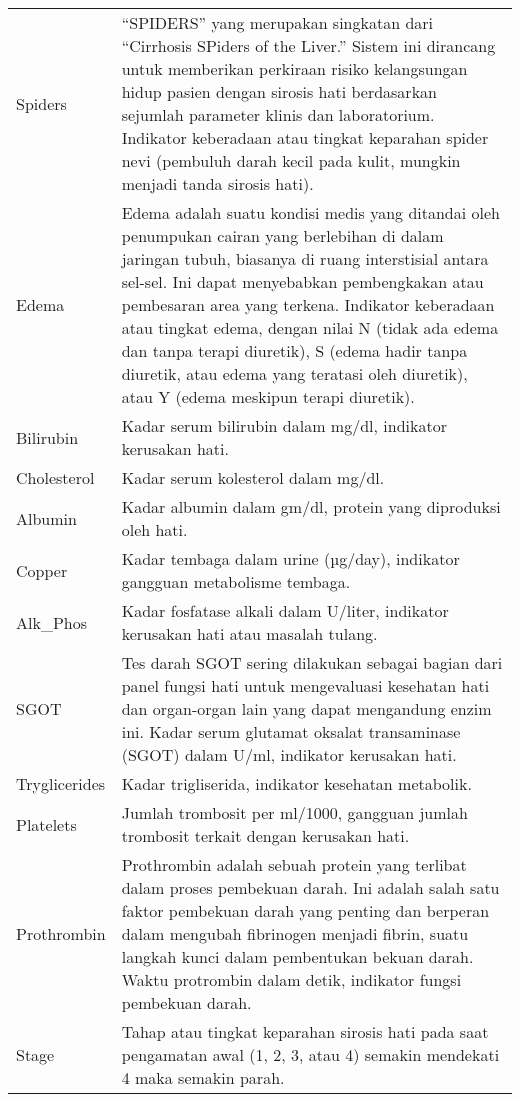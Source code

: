\documentclass[
  letterpaper,
]{krantz}
\begin{document}
\begin{longtable}[]{@{}
  >{\raggedright\arraybackslash}p{}
  >{\raggedright\arraybackslash}p{}@{}}
Spiders & ``SPIDERS'' yang merupakan singkatan dari ``Cirrhosis SPiders
of the Liver.'' Sistem ini dirancang untuk memberikan perkiraan risiko
kelangsungan hidup pasien dengan sirosis hati berdasarkan sejumlah
parameter klinis dan laboratorium. Indikator keberadaan atau tingkat
keparahan spider nevi (pembuluh darah kecil pada kulit, mungkin menjadi
tanda sirosis hati). \\
Edema & Edema adalah suatu kondisi medis yang ditandai oleh penumpukan
cairan yang berlebihan di dalam jaringan tubuh, biasanya di ruang
interstisial antara sel-sel. Ini dapat menyebabkan pembengkakan atau
pembesaran area yang terkena. Indikator keberadaan atau tingkat edema,
dengan nilai N (tidak ada edema dan tanpa terapi diuretik), S (edema
hadir tanpa diuretik, atau edema yang teratasi oleh diuretik), atau Y
(edema meskipun terapi diuretik). \\
Bilirubin & Kadar serum bilirubin dalam mg/dl, indikator kerusakan
hati. \\
Cholesterol & Kadar serum kolesterol dalam mg/dl. \\
Albumin & Kadar albumin dalam gm/dl, protein yang diproduksi oleh
hati. \\
Copper & Kadar tembaga dalam urine (µg/day), indikator gangguan
metabolisme tembaga. \\
Alk\_Phos & Kadar fosfatase alkali dalam U/liter, indikator kerusakan
hati atau masalah tulang. \\
SGOT & Tes darah SGOT sering dilakukan sebagai bagian dari panel fungsi
hati untuk mengevaluasi kesehatan hati dan organ-organ lain yang dapat
mengandung enzim ini. Kadar serum glutamat oksalat transaminase (SGOT)
dalam U/ml, indikator kerusakan hati. \\
Tryglicerides & Kadar trigliserida, indikator kesehatan metabolik. \\
Platelets & Jumlah trombosit per ml/1000, gangguan jumlah trombosit
terkait dengan kerusakan hati. \\
Prothrombin & Prothrombin adalah sebuah protein yang terlibat dalam
proses pembekuan darah. Ini adalah salah satu faktor pembekuan darah
yang penting dan berperan dalam mengubah fibrinogen menjadi fibrin,
suatu langkah kunci dalam pembentukan bekuan darah. Waktu protrombin
dalam detik, indikator fungsi pembekuan darah. \\
Stage & Tahap atau tingkat keparahan sirosis hati pada saat pengamatan
awal (1, 2, 3, atau 4) semakin mendekati 4 maka semakin parah. \\
\end{longtable}
\end{document}

